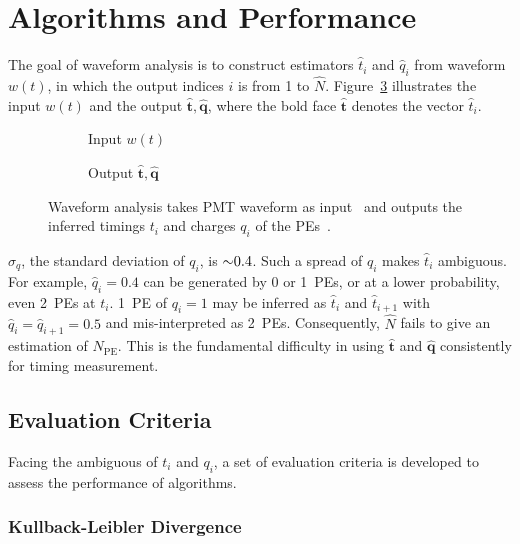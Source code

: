 \section{Algorithms and Performance} %
\label{sec:algorithm}

The goal of waveform analysis is to construct estimators $\hat{t}_i$ and $\hat{q}_i$ from waveform $w(t)$, in which the output indices $i$ is from 1 to $\hat{N}$.  Figure~\ref{fig:io} illustrates the input $w(t)$ and the output $\bm{\hat{t}}, \bm{\hat{q}}$, where the bold face $\bm{\hat{t}}$ denotes the vector $\hat{t}_i$.
\begin{figure}[H]
  \centering
  \begin{subfigure}{.45\textwidth}
    \resizebox{\textwidth}{!}{}
    \caption{\label{fig:input} Input $w(t)$}
  \end{subfigure}
  \begin{subfigure}{.45\textwidth}
    \resizebox{\textwidth}{!}{}
    \caption{\label{fig:output} Output $\bm{\hat{t}}, \bm{\hat{q}}$}
  \end{subfigure}
  \caption{\label{fig:io}Waveform analysis takes PMT waveform as input~ and outputs the inferred timings $t_i$ and charges $q_i$ of the PEs~.}
\end{figure}

$\sigma_q$, the standard deviation of $q_i$, is $\num{\sim 0.4}$.  Such a spread of $q_i$ makes $\hat{t}_i$ ambiguous. For example, $\hat{q}_i=0.4$ can be generated by 0 or 1~PEs, or at a lower probability, even 2~PEs at $t_i$. 1~PE of $q_i=1$ may be inferred as $\hat{t}_i$ and $\hat{t}_{i+1}$ with $\hat{q}_i=\hat{q}_{i+1}=0.5$ and mis-interpreted as 2~PEs.  Consequently, $\hat{N}$ fails to give an estimation of $N_\mathrm{PE}$.  This is the fundamental difficulty in using $\bm{\hat{t}}$ and $\bm{\hat{q}}$ consistently for timing measurement.

\subsection{Evaluation Criteria}
\label{sec:criteria}
Facing the ambiguous of $t_i$ and $q_i$, a set of evaluation criteria is developed to assess the performance of algorithms. 

\subsubsection{Kullback-Leibler Divergence}
\label{sec:pseudo}

